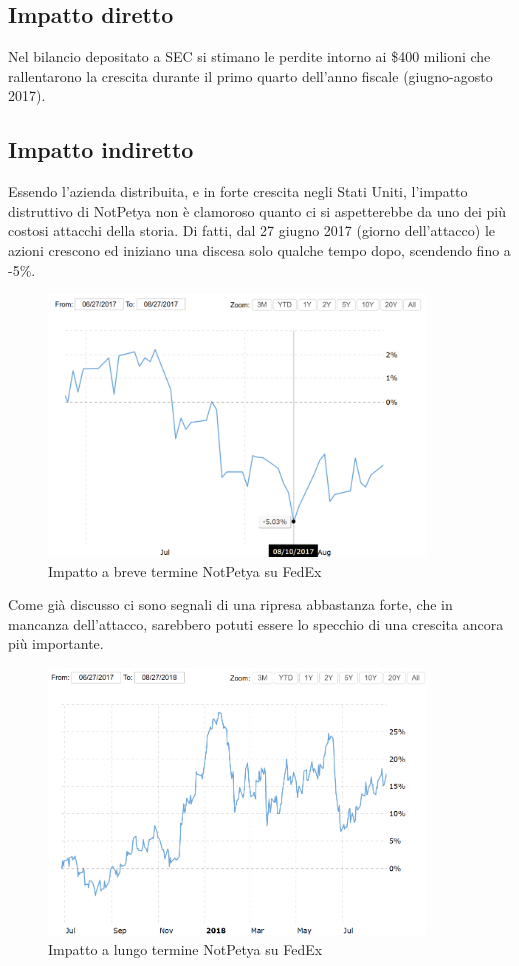 \documentclass[12pt,a4paper,openright,twoside]{report}
\begin{document}
\subsection{Impatto diretto}
Nel bilancio depositato a SEC si stimano le perdite intorno ai \$400 milioni che rallentarono la crescita durante il primo quarto dell'anno fiscale (giugno-agosto 2017).\\
\subsection{Impatto indiretto}
Essendo l'azienda distribuita, e in forte crescita negli Stati Uniti, l'impatto distruttivo di NotPetya non \`e clamoroso quanto ci si aspetterebbe da uno dei pi\`u costosi attacchi della storia. Di fatti, dal 27 giugno 2017 (giorno dell'attacco) le azioni crescono ed iniziano una discesa solo qualche tempo dopo, scendendo fino a -5\%.\\
\begin{figure}[H] 
\begin{center} 
\includegraphics[width=10cm]{figures/fedex_short.png} 
\caption[Grafico FedEx NotPetya short]{Impatto a breve termine NotPetya su FedEx}\label{fig:fdx1}
\end{center}
\end{figure}

Come gi\`a discusso ci sono segnali di una ripresa abbastanza forte, che in mancanza dell'attacco, sarebbero potuti essere lo specchio di una crescita  ancora pi\`u importante.

\begin{figure}[H] 
\begin{center} 
\includegraphics[width=10cm]{figures/fedex_long.png} 
\caption[Grafico FedEx NotPetya long]{Impatto a lungo termine NotPetya su FedEx}\label{fig:fdx2}
\end{center}
\end{figure}
\end{document}
